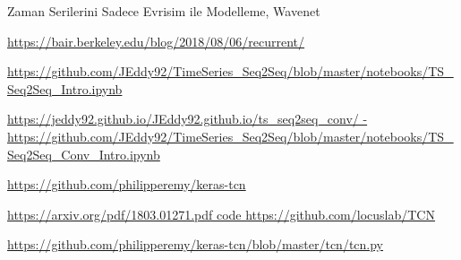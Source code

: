 \documentclass[12pt,fleqn]{article}\usepackage{../../common}
\begin{document}
Zaman Serilerini Sadece Evrisim ile Modelleme, Wavenet 











\url{https://bair.berkeley.edu/blog/2018/08/06/recurrent/}

\url{https://github.com/JEddy92/TimeSeries_Seq2Seq/blob/master/notebooks/TS_Seq2Seq_Intro.ipynb}

\url{https://jeddy92.github.io/JEddy92.github.io/ts_seq2seq_conv/ - https://github.com/JEddy92/TimeSeries_Seq2Seq/blob/master/notebooks/TS_Seq2Seq_Conv_Intro.ipynb}

\url{https://github.com/philipperemy/keras-tcn}

\url{https://arxiv.org/pdf/1803.01271.pdf code https://github.com/locuslab/TCN}

\url{https://github.com/philipperemy/keras-tcn/blob/master/tcn/tcn.py}
\end{document}
